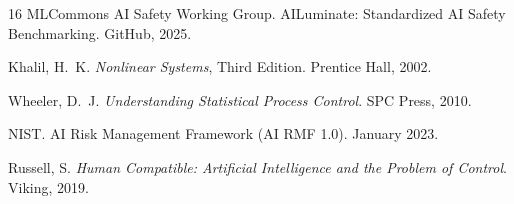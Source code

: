 \documentclass[11pt,twocolumn]{article}
\begin{document}
\begin{thebibliography}{16}
MLCommons AI Safety Working Group.
\newblock AILuminate: Standardized AI Safety Benchmarking.
\newblock GitHub, 2025.

Khalil, H.~K.
\newblock \emph{Nonlinear Systems}, Third Edition.
\newblock Prentice Hall, 2002.

Wheeler, D.~J.
\newblock \emph{Understanding Statistical Process Control}.
\newblock SPC Press, 2010.

NIST.
\newblock AI Risk Management Framework (AI RMF 1.0).
\newblock January 2023.

Russell, S.
\newblock \emph{Human Compatible: Artificial Intelligence and the Problem of Control}.
\newblock Viking, 2019.

\end{thebibliography}
\end{document}
